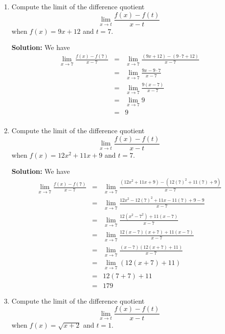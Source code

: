 \documentclass{article}
\begin{document}
\ActivityTitle[class=Calculus I, number=2, name=Continuity (Solutions)]

\begin{enumerate}
\item Compute the limit of the difference quotient \[ \lim_{x \rightarrow t} \frac{f(x) - f(t)}{x - t} \] when $f(x) = 9 x + 12$ and $t = 7$.

\textbf{Solution:} We have
\begin{eqnarray*}
\lim_{x \rightarrow 7} \frac{f(x) - f(7)}{x - 7} & = & \lim_{x \rightarrow 7} \frac{(9 x + 12) - (9 \cdot 7 + 12)}{x - 7} \\
 & = & \lim_{x \rightarrow 7} \frac{9 x - 9 \cdot 7}{x - 7} \\
 & = & \lim_{x \rightarrow 7} \frac{9(x - 7)}{x - 7} \\
 & = & \lim_{x \rightarrow 7} 9 \\
 & = & 9 \\
\end{eqnarray*}


  

\item Compute the limit of the difference quotient \[ \lim_{x \rightarrow t} \frac{f(x) - f(t)}{x - t} \] when $f(x) = 12 x^2 + 11 x + 9$ and $t = 7$.

\textbf{Solution:} We have
\begin{eqnarray*}
\lim_{x \rightarrow 7} \frac{f(x) - f(7)}{x - 7} & = & \lim_{x \rightarrow 7} \frac{(12 x^2 + 11 x + 9) - (12 (7)^2 + 11(7) + 9)}{x - 7} \\
 & = & \lim_{x \rightarrow 7} \frac{12 x^2 - 12(7)^2 + 11 x - 11(7) + 9 - 9}{x - 7} \\
 & = & \lim_{x \rightarrow 7} \frac{12(x^2 - 7^2) + 11(x - 7)}{x - 7} \\
 & = & \lim_{x \rightarrow 7} \frac{12(x - 7)(x + 7) + 11(x - 7)}{x - 7} \\
 & = & \lim_{x \rightarrow 7} \frac{(x - 7)(12(x + 7) + 11)}{x - 7} \\
 & = & \lim_{x \rightarrow 7} \left( 12(x + 7) + 11 \right) \\
 & = & 12(7 + 7) + 11\\
 & = & 179
\end{eqnarray*}


  

\item Compute the limit of the difference quotient \[ \lim_{x \rightarrow t} \frac{f(x) - f(t)}{x - t} \] when $f(x) = \sqrt{x + 2}$ and $t = 1$.


\end{enumerate}
\end{document}
